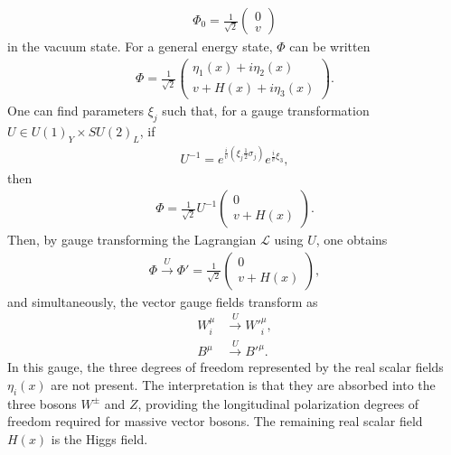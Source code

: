 \documentclass[twoside,english]{uiofysmaster}
\begin{document}
\begin{align}
	\Phi_0 = \frac{1}{\sqrt{2}} \begin{pmatrix}
		0 \\ v
	\end{pmatrix}
\end{align}
in the vacuum state. For a general energy state, $\Phi$ can be written
\begin{align}
	\Phi = \frac{1}{\sqrt{2}} \begin{pmatrix}
		\eta_1(x) + i\eta_2(x) \\
		v + H(x) + i\eta_3(x)
	\end{pmatrix}.
\end{align}
One can find parameters $\xi_j$ such that, for a gauge transformation $U \in U(1)_Y\times SU(2)_L$, if
\begin{align}
	U^{-1} = e^{\frac{i}{v}\left(\xi_j\frac{1}{2}\sigma_j\right)} e^{\frac{i}{v} \xi_3},
\end{align}
then
\begin{align}
	\Phi = \frac{1}{\sqrt{2}} U^{-1} \begin{pmatrix}
		0 \\ v + H(x)
	\end{pmatrix}.
\end{align}
Then, by gauge transforming the Lagrangian $\mathcal{L}$ using $U$, one obtains
\begin{align}
	\Phi \overset{U}{\to} \Phi' = \frac{1}{\sqrt{2}}\begin{pmatrix}
		0 \\ v + H(x)
	\end{pmatrix},
\end{align}
and simultaneously, the vector gauge fields transform as
\begin{align}
	W^\mu_i &\overset{U}{\to} W'^\mu_i ,\label{eq:SSB_gauge_transformation}\\
	B^\mu &\overset{U}{\to} B'^\mu .\nonumber
\end{align}
In this gauge, the three degrees of freedom represented by the real scalar fields $\eta_i(x)$ are not present. The interpretation is that they are absorbed into the three bosons $W^\pm$ and $Z$, providing the longitudinal polarization degrees of freedom required for massive vector bosons. The remaining real scalar field $H(x)$ is the Higgs field.
\end{document}
